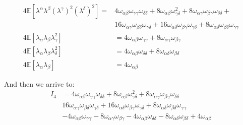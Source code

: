 \begin{align*}
4 \mathbb{E}\left[\lambda^\alpha \lambda^\beta\left(\lambda^\gamma\right)^2\left(\lambda^\delta\right)^2\right]=& 4 \omega_{\alpha \beta} \omega_{\gamma \gamma} \omega_{\delta \delta}+8 \omega_{\alpha \beta} \omega_{\gamma \delta}^2+8 \omega_{\alpha \gamma} \omega_{\beta \gamma} \omega_{\delta \delta} + \\
& 16 \omega_{\alpha \gamma} \omega_{\beta \delta} \omega_{\gamma \delta}+16 \omega_{\alpha \delta} \omega_{\beta \gamma} \omega_{\gamma \delta}+8 \omega_{\alpha \delta} \omega_{\beta \delta} \omega_{\gamma \gamma}  \\
4\mathbb{E} [\lambda_\alpha \lambda_\beta \lambda_\gamma^2] &= 4\omega_{\alpha \beta} \omega_{\gamma \gamma} + 8 \omega_{\alpha \gamma} \omega_{\beta \gamma}\\
4\mathbb{E}[\lambda_\alpha \lambda_\beta \lambda_\delta^2] &= 4\omega_{\alpha \beta} \omega_{\delta \delta} + 8 \omega_{\alpha \delta} \omega_{\beta \delta} \\
4 \mathbb{E}[\lambda_\alpha \lambda_\beta] &= 4\omega_{\alpha \beta}
\end{align*}

And then we arrive to:
\begin{align*}
    I_4 &= 4 \omega_{\alpha \beta} \omega_{\gamma \gamma} \omega_{\delta \delta}+8 \omega_{\alpha \beta} \omega_{\gamma \delta}^2+8 \omega_{\alpha \gamma} \omega_{\beta \gamma} \omega_{\delta \delta} \\
& 16 \omega_{\alpha \gamma} \omega_{\beta \delta} \omega_{\gamma \delta}+16 \omega_{\alpha \delta} \omega_{\beta \gamma} \omega_{\gamma \delta}+8 \omega_{\alpha \delta} \omega_{\beta \delta} \omega_{\gamma \gamma} \\
& -4\omega_{\alpha \beta} \omega_{\gamma \gamma} - 8 \omega_{\alpha \gamma} \omega_{\beta \gamma} -  4\omega_{\alpha \beta} \omega_{\delta \delta} - 8 \omega_{\alpha \delta} \omega_{\beta \delta}  + 4 \omega_{\alpha \beta}
\end{align*}

